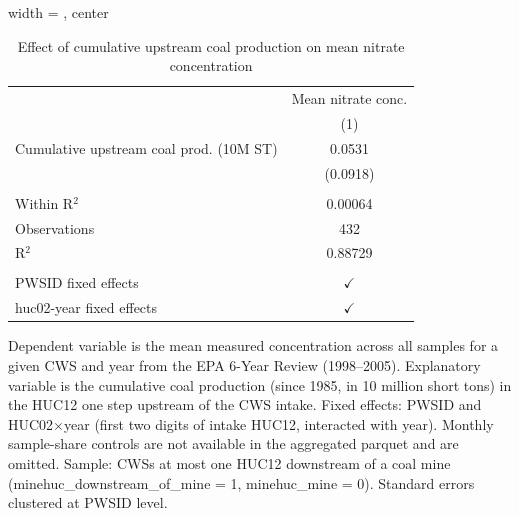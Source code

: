 
\begin{table}[htbp]
   
   \caption{\label{tab:6yr_huc02fe_nitrate_mean} Effect of cumulative upstream coal production on mean nitrate concentration}
   \bigskip
   
   \centering
   
   \begin{adjustbox}{width = \textwidth, center}
      
      
      \begin{tabular}{lc}
         \toprule
         
                                                 & Mean nitrate conc.\\  
         
                                                 & (1)\\  
         
         \midrule 
         Cumulative upstream coal prod. (10M ST) & 0.0531\\   
                                                 & (0.0918)\\   
         
          \\
         
         Within R$^2$                            & 0.00064\\  
         Observations                            & 432\\  
         R$^2$                                   & 0.88729\\  
         
          \\
         
         PWSID fixed effects                     & $\checkmark$\\   
         huc02-year fixed effects                & $\checkmark$\\   
         
         \bottomrule
         
      \end{tabular}
      
      
      
   \end{adjustbox}
      {\tiny\linespread{1}\selectfont \par \raggedright 
   Dependent variable is the mean measured concentration across all samples for a given CWS and year from the EPA 6-Year Review (1998--2005). Explanatory variable is the cumulative coal production (since 1985, in 10 million short tons) in the HUC12 one step upstream of the CWS intake. Fixed effects: PWSID and HUC02$\times$year (first two digits of intake HUC12, interacted with year). Monthly sample-share controls are not available in the aggregated parquet and are omitted. Sample: CWSs at most one HUC12 downstream of a coal mine (minehuc\_downstream\_of\_mine = 1, minehuc\_mine = 0). Standard errors clustered at PWSID level.}
   
\end{table}


